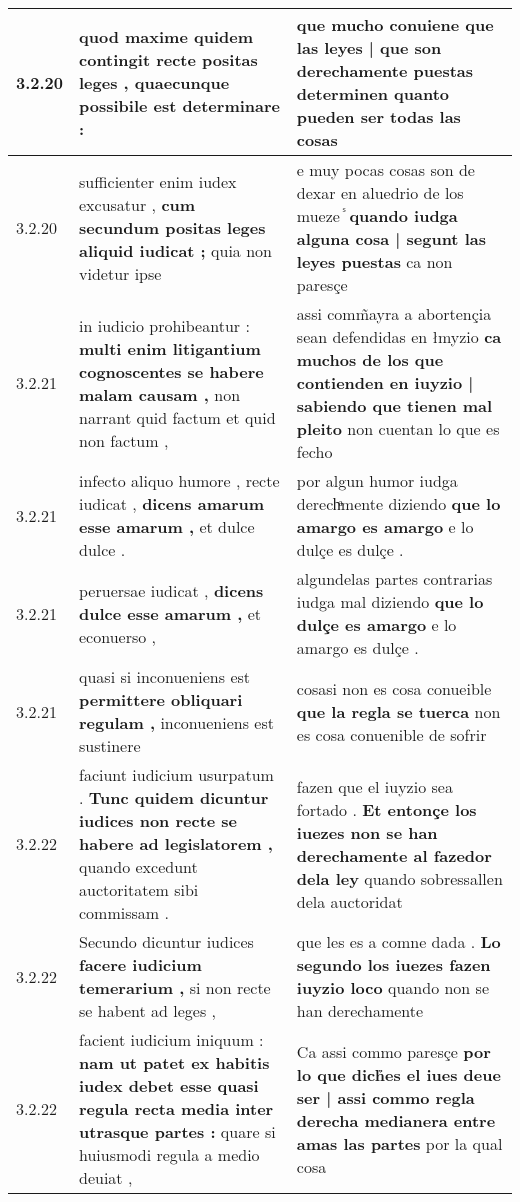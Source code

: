 \begin{tabular}{|p{1cm}|p{6.5cm}|p{6.5cm}|}
3.2.20 & quod maxime quidem contingit \textbf{ recte positas leges , } quaecunque possibile est determinare : & que mucho conuiene \textbf{ que las leyes | que son derechamente puestas determinen } quanto pueden ser todas las cosas \\\hline
3.2.20 & sufficienter enim iudex excusatur , \textbf{ cum secundum positas leges aliquid iudicat ; } quia non videtur ipse & e muy pocas cosas son de dexar en aluedrio de los mueze ᷤ \textbf{ quando iudga alguna cosa | segunt las leyes puestas } ca non paresçe \\\hline
3.2.21 & in iudicio prohibeantur : \textbf{ multi enim litigantium cognoscentes se habere malam causam , } non narrant quid factum et quid non factum , & assi comm̃ayra a abortençia sean defendidas en łmyzio \textbf{ ca muchos de los que contienden en iuyzio | sabiendo que tienen mal pleito } non cuentan lo que es fecho \\\hline
3.2.21 & infecto aliquo humore , recte iudicat , \textbf{ dicens amarum esse amarum , } et dulce dulce . & por algun humor iudga derechͣmente diziendo \textbf{ que lo amargo es amargo } e lo dulçe es dulçe . \\\hline
3.2.21 & peruersae iudicat , \textbf{ dicens dulce esse amarum , } et econuerso , & algundelas partes contrarias iudga mal diziendo \textbf{ que lo dulçe es amargo } e lo amargo es dulçe . \\\hline
3.2.21 & quasi si inconueniens est \textbf{ permittere obliquari regulam , } inconueniens est sustinere & cosasi non es cosa conueible \textbf{ que la regla se tuerca } non es cosa conuenible de sofrir \\\hline
3.2.22 & faciunt iudicium usurpatum . \textbf{ Tunc quidem dicuntur iudices non recte se habere ad legislatorem , } quando excedunt auctoritatem sibi commissam . & fazen que el iuyzio sea fortado . \textbf{ Et entonçe los iuezes non se han derechamente al fazedor dela ley } quando sobressallen dela auctoridat \\\hline
3.2.22 & Secundo dicuntur iudices \textbf{ facere iudicium temerarium , } si non recte se habent ad leges , & que les es a comne dada . \textbf{ Lo segundo los iuezes fazen iuyzio loco } quando non se han derechamente \\\hline
3.2.22 & facient iudicium iniquum : \textbf{ nam ut patet ex habitis iudex debet esse quasi regula recta media inter utrasque partes : } quare si huiusmodi regula a medio deuiat , & Ca assi commo paresçe \textbf{ por lo que dich̉es el iues deue ser | assi commo regla derecha medianera entre amas las partes } por la qual cosa \\\hline

\end{tabular}
